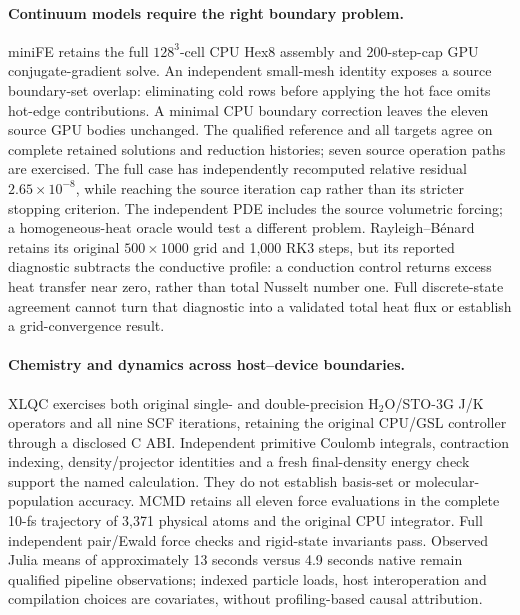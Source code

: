 \paragraph{Continuum models require the right boundary problem.}
miniFE retains the full $128^3$-cell CPU Hex8 assembly and 200-step-cap GPU conjugate-gradient solve. An independent small-mesh identity exposes a source boundary-set overlap: eliminating cold rows before applying the hot face omits hot-edge contributions. A minimal CPU boundary correction leaves the eleven source GPU bodies unchanged. The qualified reference and all targets agree on complete retained solutions and reduction histories; seven source operation paths are exercised. The full case has independently recomputed relative residual $2.65\times10^{-8}$, while reaching the source iteration cap rather than its stricter stopping criterion. The independent PDE includes the source volumetric forcing; a homogeneous-heat oracle would test a different problem. Rayleigh--B\'enard retains its original $500\times1000$ grid and 1,000 RK3 steps, but its reported diagnostic subtracts the conductive profile: a conduction control returns excess heat transfer near zero, rather than total Nusselt number one. Full discrete-state agreement cannot turn that diagnostic into a validated total heat flux or establish a grid-convergence result.

\paragraph{Chemistry and dynamics across host--device boundaries.}
XLQC exercises both original single- and double-precision H$_2$O/STO-3G J/K operators and all nine SCF iterations, retaining the original CPU/GSL controller through a disclosed C ABI. Independent primitive Coulomb integrals, contraction indexing, density/projector identities and a fresh final-density energy check support the named calculation. They do not establish basis-set or molecular-population accuracy. MCMD retains all eleven force evaluations in the complete 10-fs trajectory of 3,371 physical atoms and the original CPU integrator. Full independent pair/Ewald force checks and rigid-state invariants pass. Observed Julia means of approximately 13 seconds versus 4.9 seconds native remain qualified pipeline observations; indexed particle loads, host interoperation and compilation choices are covariates, without profiling-based causal attribution.

